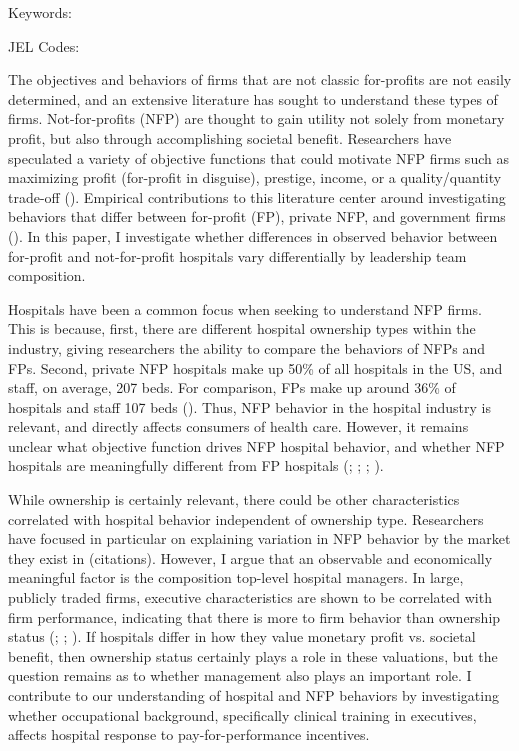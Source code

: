 \documentclass[12pt]{article}
\begin{document}
	
	
	
	\vspace{0.8in}
	
	\noindent Keywords: 
	
	\noindent JEL Codes: 
	
	\onehalfspacing
	
	\newpage

  The objectives and behaviors of firms that are not classic for-profits are not easily determined, and an extensive literature has sought to understand these types of firms. Not-for-profits (NFP) are thought to gain utility not solely from monetary profit, but also through accomplishing societal benefit. Researchers have speculated a variety of objective functions that could motivate NFP firms such as maximizing profit (for-profit in disguise), prestige, income, or a quality/quantity trade-off (\cite{steinberg1986revealed}). Empirical contributions to this literature center around investigating behaviors that differ between for-profit (FP), private NFP, and government firms (\cite{sloan2000not}). In this paper, I investigate whether differences in observed behavior between for-profit and not-for-profit hospitals vary differentially by leadership team composition. 
  
  Hospitals have been a common focus when seeking to understand NFP firms. This is because, first, there are different hospital ownership types within the industry, giving researchers the ability to compare the behaviors of NFPs and FPs. Second, private NFP hospitals make up 50\% of all hospitals in the US, and staff, on average, 207 beds. For comparison, FPs make up around 36\% of hospitals and staff 107 beds (\cite{ASPE_2023}). Thus, NFP behavior in the hospital industry is relevant, and directly affects consumers of health care. However, it remains unclear what objective function drives NFP hospital behavior, and whether NFP hospitals are meaningfully different from FP hospitals (\cite{sloan2000not}; \cite{erus2002inferring}; \cite{deneffe2002not}; \cite{horwitz2009hospital}). 
  
  While ownership is certainly relevant, there could be other characteristics correlated with hospital behavior independent of ownership type. Researchers have focused in particular on explaining variation in NFP behavior by the market they exist in (citations). However, I argue that an observable and economically meaningful factor is the composition top-level hospital managers. In large, publicly traded firms, executive characteristics are shown to be correlated with firm performance, indicating that there is more to firm behavior than ownership status (\cite{bertrand2003managing}; \cite{matsa2013female}; \cite{ahern2012changing}). If hospitals differ in how they value monetary profit vs. societal benefit, then ownership status certainly plays a role in these valuations, but the question remains as to whether management also plays an important role. I contribute to our understanding of hospital and NFP behaviors by investigating whether occupational background, specifically clinical training in executives, affects hospital response to pay-for-performance incentives.
\end{document}
